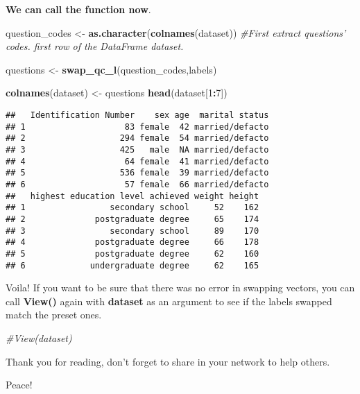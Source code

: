 \documentclass[]{article}
\newenvironment{Shaded}{\begin{snugshade}}{\end{snugshade}}
\newcommand{\CommentTok}[1]{\textcolor[rgb]{0.56,0.35,0.01}{\textit{#1}}}
\newcommand{\DecValTok}[1]{\textcolor[rgb]{0.00,0.00,0.81}{#1}}
\newcommand{\KeywordTok}[1]{\textcolor[rgb]{0.13,0.29,0.53}{\textbf{#1}}}
\newcommand{\NormalTok}[1]{#1}
\newcommand{\OperatorTok}[1]{\textcolor[rgb]{0.81,0.36,0.00}{\textbf{#1}}}
\newcommand{\StringTok}[1]{\textcolor[rgb]{0.31,0.60,0.02}{#1}}
\begin{document}
\textbf{We can call the function now}.

\begin{Shaded}
\begin{Highlighting}[]
\NormalTok{question_codes <-}\StringTok{ }\KeywordTok{as.character}\NormalTok{(}\KeywordTok{colnames}\NormalTok{(dataset)) }\CommentTok{#First extract questions' codes. first row of the DataFrame dataset.}

\NormalTok{questions <-}\StringTok{ }\KeywordTok{swap_qc_l}\NormalTok{(question_codes,labels)}

\KeywordTok{colnames}\NormalTok{(dataset) <-}\StringTok{ }\NormalTok{questions}
\KeywordTok{head}\NormalTok{(dataset[}\DecValTok{1}\OperatorTok{:}\DecValTok{7}\NormalTok{])}
\end{Highlighting}
\end{Shaded}

\begin{verbatim}
##   Identification Number    sex age  marital status
## 1                    83 female  42 married/defacto
## 2                   294 female  54 married/defacto
## 3                   425   male  NA married/defacto
## 4                    64 female  41 married/defacto
## 5                   536 female  39 married/defacto
## 6                    57 female  66 married/defacto
##   highest education level achieved weight height
## 1                 secondary school     52    162
## 2              postgraduate degree     65    174
## 3                 secondary school     89    170
## 4              postgraduate degree     66    178
## 5              postgraduate degree     62    160
## 6             undergraduate degree     62    165
\end{verbatim}

Voila! If you want to be sure that there was no error in swapping
vectors, you can call \textbf{View()} again with \textbf{dataset} as an
argument to see if the labels swapped match the preset ones.

\begin{Shaded}
\begin{Highlighting}[]
\CommentTok{#View(dataset)}
\end{Highlighting}
\end{Shaded}

Thank you for reading, don't forget to share in your network to help
others.

Peace!
\end{document}
